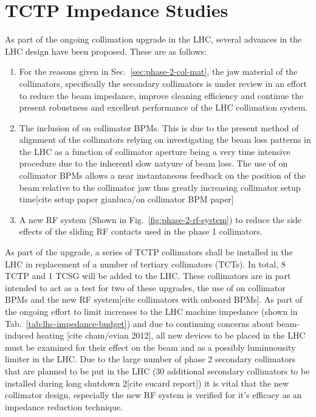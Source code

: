 \section{TCTP Impedance Studies}

As part of the ongoing collimation upgrade in the LHC, several advances in the LHC design have been proposed. These are as follows:

\begin{enumerate}
\item{For the reasons given in Sec.~\ref{sec:phase-2-col-mat}, the jaw material of the collimators, specifically the secondary collimators is under review in an effort to reduce the beam impedance, improve cleaning efficiency and continue the present robustness and excellent performance of the LHC collimation system.}
\item{The inclusion of on collimator BPMs. This is due to the present method of alignment of the collimators relying on investigating the beam loss patterns in the LHC as a function of collimator aperture being a very time intensive procedure due to the inherentl slow natyure of beam loss. The use of on collimator BPMs allows a near instantaneous feedback on the position of the beam relative to the collimator jaw thus greatly increasing collimator setup time[cite setup paper gianluca/on collimator BPM paper]}
\item{A new RF system (Shown in Fig.~\ref{fig:phase-2-rf-system}) to reduce the side effects of the sliding RF contacts used in the phase 1 collimators.}
\end{enumerate}

As part of the upgrade, a series of TCTP collimators shall be installed in the LHC in replacement of a number of tertiary collimators (TCTs). In total, 8 TCTP and 1 TCSG will be added to the LHC. These collimators are in part intended to act as a test for two of these upgrades, the use of on collimator BPMs and the new RF system[cite collimators with onboard BPMs]. As part of the ongoing effort to limit increases to the LHC machine impedance (shown in Tab.~\ref{tab:lhc-impedance-budget}) and due to continuing concerns about beam-induced heating [cite cham/evian 2012], all new devices to be placed in the LHC must be examined for their effect on the beam and as a possibly luminuousity limiter in the LHC. Due to the large number of phase 2 secondary collimators that are planned to be put in the LHC (30 additional secondary collimators to be installed during long shutdown 2[cite eucard report]) it is vital that the new collimator design, especially the new RF system is verified for it's efficacy as an impedance reduction technique.  


